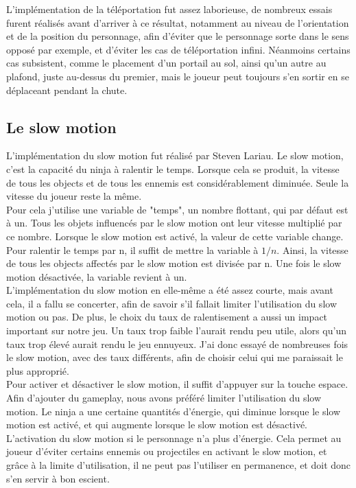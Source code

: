\documentclass[12pt]{article}
\begin{document}
L'implémentation de la téléportation fut assez laborieuse, de nombreux essais furent réalisés avant d'arriver à ce résultat, notamment au niveau de l'orientation et de la position du personnage, afin d'éviter que le personnage sorte dans le sens opposé par exemple, et d'éviter les cas de téléportation infini. Néanmoins certains cas subsistent, comme le placement d'un portail au sol, ainsi qu'un autre au plafond, juste au-dessus du premier, mais le joueur peut toujours s'en sortir en se déplaceant pendant la chute.

\newpage

\subsection{Le slow motion}

L'implémentation du \gls{slow motion} fut réalisé par Steven Lariau.
Le slow motion, c'est la capacité du ninja à ralentir le temps. Lorsque cela se produit, la vitesse de tous les objects et de tous les ennemis est considérablement diminuée. Seule la vitesse du joueur reste la même.\\
Pour cela j'utilise une variable de "temps", un nombre flottant, qui par défaut est à un. Tous les objets influencés par le slow motion ont leur vitesse multiplié par ce nombre. Lorsque le slow motion est activé, la valeur de cette variable change. Pour ralentir le temps par n, il suffit de mettre la variable à $1/n$. Ainsi, la vitesse de tous les objects affectés par le slow motion est divisée par n. Une fois le slow motion désactivée, la variable revient à un.\\
L'implémentation du slow motion en elle-même a été assez courte, mais avant cela, il a fallu se concerter, afin de savoir s'il fallait limiter l'utilisation du slow motion ou pas. De plus, le choix du taux de ralentisement a aussi un impact important sur notre jeu. Un taux trop faible l'aurait rendu peu utile, alors qu'un taux trop élevé aurait rendu le jeu ennuyeux. J'ai donc essayé de nombreuses fois le slow motion, avec des taux différents, afin de choisir celui qui me paraissait le plus approprié.\\

Pour activer et désactiver le slow motion, il suffit d'appuyer sur la touche espace. Afin d'ajouter du gameplay, nous avons préféré limiter l'utilisation du slow motion. Le ninja a une certaine quantités d'énergie, qui diminue lorsque le slow motion est activé, et qui augmente lorsque le slow motion est désactivé. L'activation du slow motion si le personnage n'a plus d'énergie. Cela permet au joueur d'éviter certains ennemis ou projectiles en activant le slow motion, et grâce à la limite d'utilisation, il ne peut pas l'utiliser en permanence, et doit donc s'en servir à bon escient.
\end{document}
